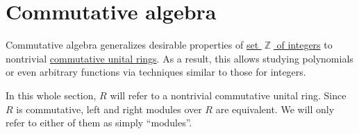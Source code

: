 \section{Commutative algebra}\label{sec:commutative_algebra}

Commutative algebra generalizes desirable properties of \hyperref[def:set_of_integers]{set \( \BbbZ \) of integers} to nontrivial \hyperref[def:semiring/commutative_unital_ring]{commutative unital rings}. As a result, this allows studying polynomials or even arbitrary functions via techniques similar to those for integers.

In this whole section, \( R \) will refer to a nontrivial commutative unital ring. Since \( R \) is commutative, left and right modules over \( R \) are equivalent. We will only refer to either of them as simply \enquote{modules}.
